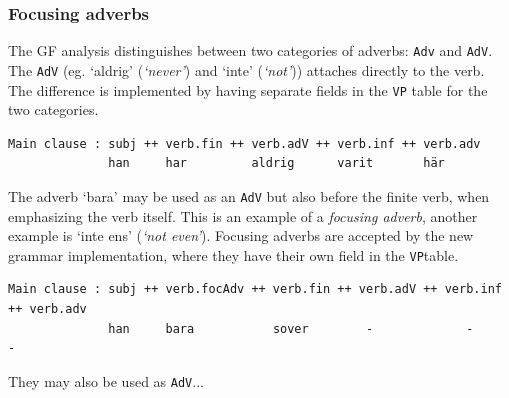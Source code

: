 \documentclass{report}
\begin{document}
\subsubsection{Focusing adverbs}
The GF analysis distinguishes between two categories of adverbs: \verb-Adv- 
and \verb-AdV-. %
The \verb-AdV- (eg. `aldrig' (\emph{`never'}) and `inte' (\emph{`not'}))
attaches directly to the verb.
The difference is implemented by having separate fields in the \verb-VP- table
for the two categories.
\begin{verbatim}
Main clause : subj ++ verb.fin ++ verb.adV ++ verb.inf ++ verb.adv
              han     har         aldrig      varit       här 
\end{verbatim}
The adverb `bara' may be used as an \verb-AdV- but also before the finite verb,
when emphasizing the verb itself.
This is an example of a \textit{focusing adverb}, another example is `inte ens' (\emph{`not even'}).
Focusing adverbs are accepted by the new grammar implementation, where they have
their own field in the \verb-VP-table.
\begin{verbatim}
Main clause : subj ++ verb.focAdv ++ verb.fin ++ verb.adV ++ verb.inf ++ verb.adv
              han     bara           sover        -             -           -
\end{verbatim}
They may also be used as \verb-AdV-...
\end{document}
